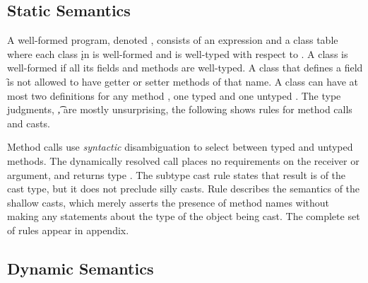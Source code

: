 \documentclass[a4paper,USenglish]{tex/lipics-v2016}
\begin{document}


\subsection{Static Semantics}

A well-formed program, denoted \WFp\e\K, consists of an expression \e and a
class table \K where each class \k in \K is well-formed and \e is well-typed
with respect to \K.  A class is well-formed if all its fields and methods
are well-typed. A class that defines a field \f is not allowed to have
getter or setter methods of that name.  A class can have at most two
definitions for any method \m, one typed \Mdef\m\x\C\D\e and one untyped
\Mdef\m\x\any\any\e. The type judgments, \EnvType\Env\s\K\e\t, are mostly
unsurprising, the following shows rules for method calls and casts.

{\small
\begin{mathpar}



\end{mathpar}}

\noindent Method calls use \emph{syntactic} disambiguation to select between
typed and untyped methods. The dynamically resolved call places no
requirements on the receiver or argument, and returns type \any. The subtype
cast rule  states that result is of the cast type, but it does
not preclude silly casts.  Rule  describes the semantics of the
shallow casts, which merely asserts the presence of method names without
making any statements about the type of the object being cast. 
The complete set of rules appear in appendix.


\subsection{Dynamic Semantics}
\end{document}
